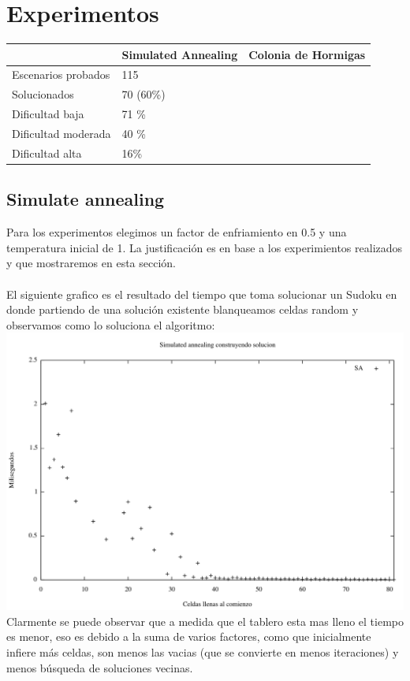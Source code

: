 \section{Experimentos}

\begin{table}
\centering
\begin{tabular}{|l|l|l|}
\hline
          & \textbf{Simulated Annealing} & \textbf{Colonia de Hormigas} \\ \hline
{Escenarios probados} &       115                       &                              \\ \hline
{Solucionados} &                      70 (60\%)      &                              \\ \hline
{Dificultad baja} &                     71 \%         &                              \\ \hline
{Dificultad moderada} &                  40 \%            &                              \\ \hline
{Dificultad alta} &                         16\%     &                              \\ \hline
\end{tabular}
\end{table}

\subsection{Simulate annealing}
Para los experimentos elegimos un factor de enfriamiento en 0.5 y una temperatura inicial de 1. La justificación es en base a los experimientos realizados y que mostraremos en esta sección. \\ \\

El siguiente grafico es el resultado del tiempo que toma solucionar un Sudoku en donde partiendo de una solución existente blanqueamos celdas random y observamos como lo soluciona el algoritmo:
\includegraphics[scale=0.6]{imgs/randomSA.png}	
Clarmente se puede observar que a medida que el tablero esta mas lleno el tiempo es menor, eso es debido a la suma de varios factores, como que inicialmente infiere más celdas, son menos las vacias (que se convierte en menos iteraciones) y menos búsqueda de soluciones vecinas.\\\\

